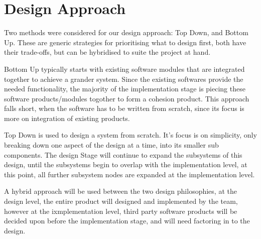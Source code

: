 \section{Design Approach}



Two methods were considered for our design approach: Top Down, and Bottom Up.
These are generic strategies for prioritising what to design first, both have their trade-offs, but can be hybridised to suite the project at hand.

Bottom Up typically starts with existing software modules that are integrated together to achieve a grander system.
Since the existing softwares provide the needed functionality, the majority of the implementation stage is piecing these software products/modules togother to form a cohesion product.
This approach falls short, when the software has to be written from scratch, since its focus is more on integration of existing products.

Top Down is used to design a system from scratch.
It's focus is on simplicity, only breaking down one aspect of the design at a time, into its smaller sub components.
The design Stage will continue to expand the subsystems of this design, until the subsystems begin to overlap with the implementation level, at this point, all further subsystem nodes are expanded at the implementation level.

A hybrid approach will be used between the two design philosophies, at the design level, the  entire product will designed and implemented by the team, however at the ixmplementation level, third party software products will be decided upon before the implementation stage, and will need factoring in to the design.
